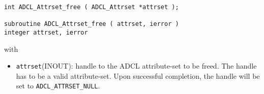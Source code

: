 \begin{verbatim}
int ADCL_Attrset_free ( ADCL_Attrset *attrset );

subroutine ADCL_Attrset_free ( attrset, ierror )
integer attrset, ierror
\end{verbatim}
with
\begin{itemize}
\item {\tt attrset}(INOUT): handle to the ADCL attribute-set to be freed. The handle has to be a valid attribute-set.
    	Upon successful completion, the handle will be set to {\tt ADCL\_ATTRSET\_NULL}.
\end{itemize}
